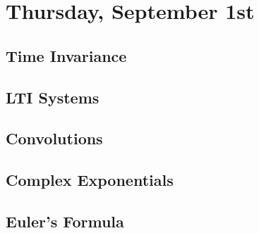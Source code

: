 \section{Thursday, September 1st}
\subsection{Time Invariance}
\subsection{LTI Systems}
\subsection{Convolutions}
\subsection{Complex Exponentials}
\subsection{Euler's Formula}

